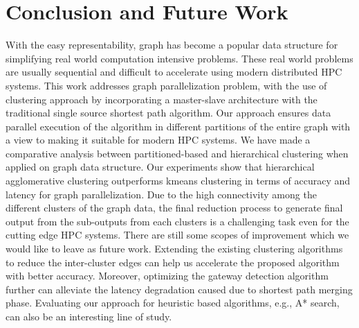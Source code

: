 \section{Conclusion and Future Work}
With the easy representability, graph has become a popular data structure for simplifying real world computation intensive problems. These real world problems are usually sequential and difficult to accelerate using modern distributed HPC systems. This work addresses graph parallelization problem, with the use of clustering approach by incorporating a master-slave architecture with the traditional single source shortest path algorithm. Our approach ensures data parallel execution of the algorithm in different partitions of the entire graph with a view to making it suitable for modern HPC systems. We have made a comparative analysis between partitioned-based and hierarchical clustering when applied on graph data structure. Our experiments show that hierarchical agglomerative clustering outperforms kmeans clustering in terms of accuracy and latency for graph parallelization. Due to the high connectivity among the different clusters of the graph data, the final reduction process to generate final output from the sub-outputs from each clusters is a challenging task even for the cutting edge HPC systems. There are still some scopes of improvement which we would like to leave as future work. Extending the existing clustering algorithms to reduce the inter-cluster edges can help us accelerate the proposed algorithm with better accuracy. Moreover, optimizing the gateway detection algorithm further can alleviate the latency degradation caused due to shortest path merging phase. Evaluating our approach for heuristic based algorithms, e.g., A* search, can also be an interesting line of study.
\label{sec:conclusion}